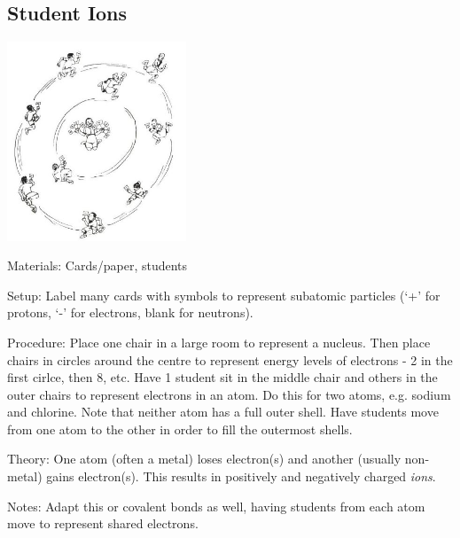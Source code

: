 \begin{multicols}{2}
\subsection{Student Ions}

\begin{center}
\includegraphics[width=0.4\textwidth]{./img/source/student-ions.jpg}
\end{center}

\begin{description*}
\item[Materials:]{Cards/paper, students}
\item[Setup:]{Label many cards with symbols to represent subatomic particles (`+' for protons, `-' for electrons, blank for neutrons).}
\item[Procedure:]{Place one chair in a large room to represent a nucleus. Then place chairs in circles around the centre to represent energy levels of electrons - 2 in the first cirlce, then 8, etc. Have 1 student sit in the middle chair and others in the outer chairs to represent electrons in an atom. Do this for two atoms, e.g. sodium and chlorine. Note that neither atom has a full outer shell. Have students move from one atom to the other in order to fill the outermost shells. }
\item[Theory:]{One atom (often a metal) loses electron(s) and another (usually non-metal) gains electron(s). This results in positively and negatively charged \emph{ions}.}
\item[Notes:]{Adapt this or covalent bonds as well, having students from each atom move to represent shared electrons.}
\end{description*}


\end{multicols}
